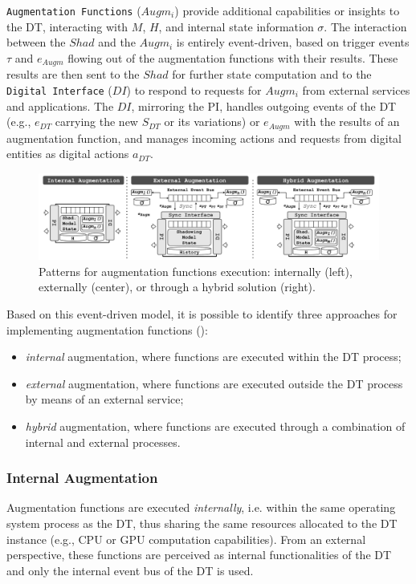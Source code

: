 \texttt{Augmentation Functions} (\( Augm_{i} \)) provide additional capabilities or insights to the \ac{DT}, interacting with \( M \), \( H \), and internal state information \( \sigma \).
The interaction between the \( Shad \) and the \( Augm_{i} \) is entirely event-driven, based on trigger events \( \tau \) and \( e_{Augm} \) flowing out of the augmentation functions with their results.
These results are then sent to the \( Shad \) for further state computation and to the \texttt{Digital Interface} (\( DI \)) to respond to requests for \( Augm_{i} \) from external services and applications.
The \( DI \), mirroring the \ac{PI}, handles outgoing events of the \ac{DT} (e.g., \( e_{DT} \) carrying the new \( S_{DT} \) or its variations) or \( e_{Augm} \) with the results of an augmentation function, and manages incoming actions and requests from digital entities as digital actions \( a_{DT} \).

\begin{figure}
    \centering
    \includegraphics[width=\textwidth]{figures/augmentation_patterns.pdf}
    \caption{Patterns for augmentation functions execution: internally (left), externally (center), or through a hybrid solution (right).}
    \label{fig:augm_function_event_driven_patterns}
\end{figure}


Based on this event-driven model, it is possible to identify three approaches for implementing augmentation functions ():
\begin{itemize}
    \item \textit{internal} augmentation, where functions are executed within the \ac{DT} process;
    \item \textit{external} augmentation, where functions are executed outside the \ac{DT} process by means of an external service;
    \item \textit{hybrid} augmentation, where functions are executed through a combination of internal and external processes.
\end{itemize}

\subsubsection{Internal Augmentation}
Augmentation functions are executed \textit{internally}, i.e. within the same operating system process as the \ac{DT}, thus sharing the same resources allocated to the \ac{DT} instance (e.g., CPU or GPU computation capabilities).
From an external perspective, these functions are perceived as internal functionalities of the \ac{DT} and only the internal event bus of the \ac{DT} is used.

